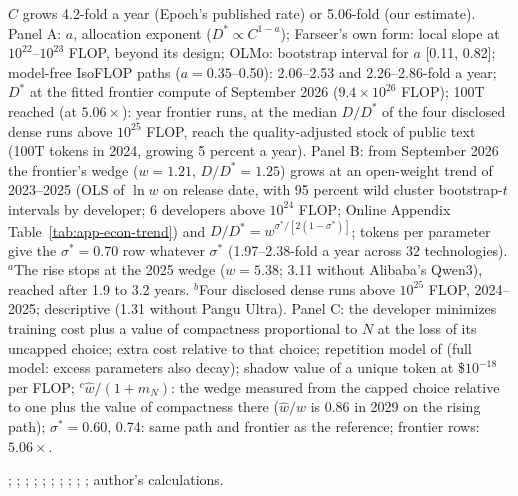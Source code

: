 \begin{table}[tp]
\begin{tablenotes}[Notes]
$C$ grows 4.2-fold a year (Epoch's published rate) or 5.06-fold (our estimate). Panel A: $a$, allocation exponent ($D^*\propto C^{1-a}$); Farseer's own form: local slope at $10^{22}$--$10^{23}$ FLOP, beyond its design; OLMo: bootstrap interval for $a$ [0.11, 0.82]; model-free IsoFLOP paths ($a=0.35$--0.50): 2.06--2.53 and 2.26--2.86-fold a year; $D^*$ at the fitted frontier compute of September 2026 ($9.4\times10^{26}$ FLOP); 100T reached (at $5.06\times$): year frontier runs, at the median $D/D^*$ of the four disclosed dense runs above $10^{25}$ FLOP, reach the quality-adjusted stock of public text (100T tokens in 2024, growing 5 percent a year). Panel B: from September 2026 the frontier's wedge ($w=1.21$, $D/D^*=1.25$) grows at an open-weight trend of 2023--2025 (OLS of $\ln w$ on release date, with 95 percent wild cluster bootstrap-$t$ intervals by developer; 6 developers above $10^{24}$ FLOP; Online Appendix Table~\ref{tab:app-econ-trend}) and $D/D^*=w^{\sigma^*/[2(1-\sigma^*)]}$; tokens per parameter give the $\sigma^*=0.70$ row whatever $\sigma^*$ (1.97--2.38-fold a year across 32 technologies). $^a$The rise stops at the 2025 wedge ($w=5.38$; 3.11 without Alibaba's Qwen3), reached after 1.9 to 3.2 years. $^b$Four disclosed dense runs above $10^{25}$ FLOP, 2024--2025; descriptive (1.31 without Pangu Ultra). Panel C: the developer minimizes training cost plus a value of compactness proportional to $N$ at the loss of its uncapped choice; extra cost relative to that choice; repetition model of \citet{muennighoff2023scaling} (full model: excess parameters also decay); shadow value of a unique token at \$$10^{-18}$ per FLOP; $^c\hat w/(1+m_N)$: the wedge measured from the capped choice relative to one plus the value of compactness there ($\hat w/w$ is 0.86 in 2029 on the rising path); $\sigma^*=0.60$, 0.74: same path and frontier as the reference; frontier rows: $5.06\times$.
\end{tablenotes}
\begin{tablenotes}[Source]
\citet{epochai2026data}; \citet{sevilla2024training}; \citet{hoffmann2022training}; \citet{besiroglu2024chinchilla}; \citet{grattafiori2024llama}; \citet{li2025predictableb}; \citet{gadre2024language}; \citet{bhagia2024establishing}; \citet{villalobos2022run}; \citet{muennighoff2023scaling}; author's calculations.
\end{tablenotes}
\end{table}
